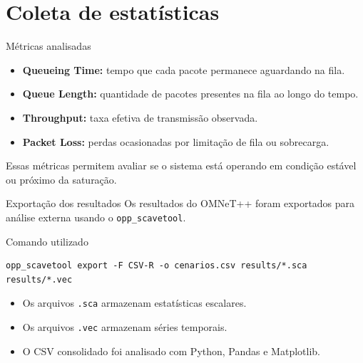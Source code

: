 \documentclass[aspectratio=169]{beamer}
\begin{document}
\section{Coleta de estatísticas}

\begin{frame}{Métricas analisadas}
\begin{itemize}
    \item \textbf{Queueing Time:} tempo que cada pacote permanece aguardando na fila.
    \item \textbf{Queue Length:} quantidade de pacotes presentes na fila ao longo do tempo.
    \item \textbf{Throughput:} taxa efetiva de transmissão observada.
    \item \textbf{Packet Loss:} perdas ocasionadas por limitação de fila ou sobrecarga.
\end{itemize}

\begin{informacao}
Essas métricas permitem avaliar se o sistema está operando em condição estável ou próximo da saturação.
\end{informacao}
\end{frame}

\begin{frame}[fragile]{Exportação dos resultados}
Os resultados do OMNeT++ foram exportados para análise externa usando o \texttt{opp\_scavetool}.

\vspace{0.4cm}
\footnotesize
\begin{block}{Comando utilizado}
\begin{verbatim}
opp_scavetool export -F CSV-R -o cenarios.csv results/*.sca results/*.vec
\end{verbatim}
\end{block}

\vspace{0.4cm}

\begin{itemize}
    \item Os arquivos \texttt{.sca} armazenam estatísticas escalares.
    \item Os arquivos \texttt{.vec} armazenam séries temporais.
    \item O CSV consolidado foi analisado com Python, Pandas e Matplotlib.
\end{itemize}
\end{frame}
\end{document}
